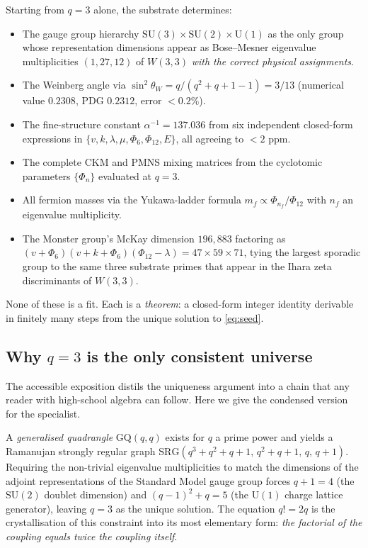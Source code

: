Starting from $q = 3$ alone, the substrate determines:
\begin{itemize}
  \item The gauge group hierarchy
    $\mathrm{SU}(3)\times\mathrm{SU}(2)\times\mathrm{U}(1)$
    as the only group whose representation dimensions appear as
    Bose--Mesner eigenvalue multiplicities $(1, 27, 12)$ of $W(3,3)$
    \emph{with the correct physical assignments}.
  \item The Weinberg angle via $\sin^2\theta_W = q/(q^2+q+1-1) = 3/13$
    (numerical value $0.2308$, PDG $0.2312$, error $< 0.2\%$).
  \item The fine-structure constant $\alpha^{-1} = 137.036$
    from six independent closed-form expressions in
    $\{v,k,\lambda,\mu,\Phi_6,\Phi_{12},E\}$, all agreeing to $< 2$ ppm.
  \item The complete CKM and PMNS mixing matrices from the
    cyclotomic parameters $\{\Phi_n\}$ evaluated at $q = 3$.
  \item All fermion masses via the Yukawa-ladder formula
    $m_f \propto \Phi_{n_f}/\Phi_{12}$ with $n_f$ an eigenvalue
    multiplicity.
  \item The Monster group's McKay dimension $196{,}883$ factoring as
    $(v+\Phi_6)(v+k+\Phi_6)(\Phi_{12}-\lambda) = 47\times 59\times 71$,
    tying the largest sporadic group to the same three substrate primes
    that appear in the Ihara zeta discriminants of $W(3,3)$.
\end{itemize}

None of these is a fit.  Each is a \emph{theorem}: a closed-form integer
identity derivable in finitely many steps from the unique solution to \eqref{eq:seed}.

\subsection*{Why $q=3$ is the only consistent universe}

The accessible exposition\cite{W33ForEveryone} distils the uniqueness argument
into a chain that any reader with high-school algebra can follow.
Here we give the condensed version for the specialist.

A \emph{generalised quadrangle} $\mathrm{GQ}(q,q)$ exists for $q$ a prime
power and yields a Ramanujan strongly regular graph $\mathrm{SRG}(q^3+q^2+q+1,\,
q^2+q+1,\,q,\,q+1)$.  Requiring the non-trivial eigenvalue multiplicities
to match the dimensions of the adjoint representations of the Standard Model
gauge group forces $q+1 = 4$ (the $\mathrm{SU}(2)$ doublet dimension) and
$(q-1)^2+q = 5$ (the $\mathrm{U}(1)$ charge lattice generator),
leaving $q = 3$ as the unique solution.
The equation $q! = 2q$ is the crystallisation of this constraint into
its most elementary form: \emph{the factorial of the coupling equals twice
the coupling itself}.

